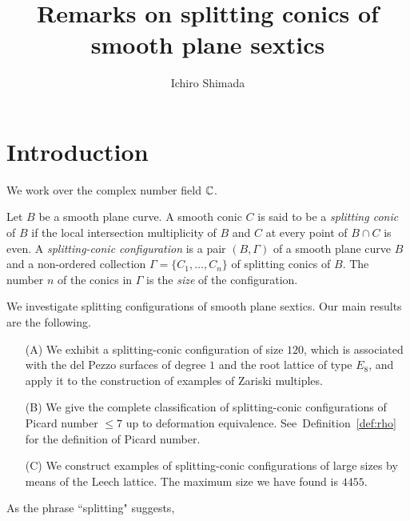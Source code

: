 \documentclass{amsart} %
\begin{document}
%
\title{Remarks on splitting conics of  smooth plane sextics} 
\author{Ichiro Shimada}
\address{Department of Mathematics,
Graduate School of Science,
Hiroshima University,
1-3-1 Kagamiyama,
Higashi-Hiroshima,
739-8526 JAPAN}
%
%

%
\begin{abstract}
\end{abstract}
%
\keywords{}
\maketitle

%
\section{Introduction}\label{sec:Intro}
%
We work over the complex number field $\mathord{\mathbb{C}}$.
\par
Let $B$ be a smooth plane curve.
A smooth conic $C$ is said to be a \emph{splitting conic} of $B$
if the local intersection multiplicity of $B$ and $C$
at every point of $B \cap C$ is even.
A \emph{splitting-conic configuration} is a pair $(B, \Gamma)$
of a smooth plane curve $B$ and a non-ordered collection
$\Gamma = \{C_1, \ldots, C_n\}$
of splitting conics of $B$.
The number $n$ of the conics in $\Gamma$ is the \emph{size}
of the configuration.
\par
We investigate splitting configurations of smooth plane sextics.
Our main results are the following.
%
\begin{enumerate}
\item[(A)]
We exhibit a splitting-conic configuration of size $120$,
which is associated with the del Pezzo surfaces of degree $1$
and the root lattice  of type $E_8$,
and apply it to the construction of examples of Zariski multiples.
%
\item[(B)]
We give the complete classification of splitting-conic configurations
of Picard number  $\le 7$ up to deformation equivalence.
See~Definition~\ref{def:rho} for the definition  of Picard number.
%
%
\item[(C)]
We construct examples of splitting-conic configurations of large sizes
by means of the Leech lattice.
The maximum size we have found is $4455$.
\end{enumerate}
%
\par
As the phrase ``splitting" suggests, 
\end{document}
